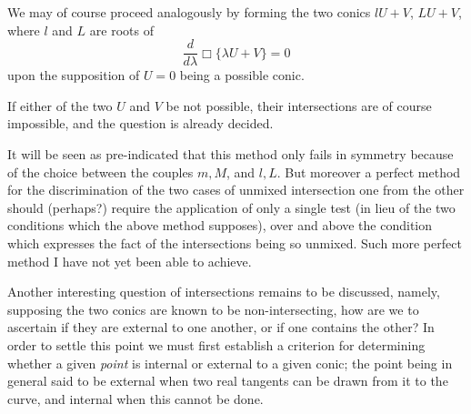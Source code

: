 \documentclass[11pt]{article}
\begin{document}
We may of course proceed analogously by forming the two conics $lU+V$, $LU+V$, where $l$ and $L$ are roots of
\[
\frac{d}{d\lambda}\Box\{\lambda U+V\}=0
\]
upon the supposition of $U=0$ being a possible conic.

If either of the two $U$ and $V$ be not possible, their intersections are of course impossible, and the question is already decided.

It will be seen as pre-indicated that this method only fails in symmetry because of the choice between the couples $m,M$, and $l,L$. But moreover a perfect method for the discrimination of the two cases of unmixed intersection one from the other should (perhaps?) require the application of only a single test (in lieu of the two conditions which the above method supposes), over and above the condition which expresses the fact of the intersections being so unmixed. Such more perfect method I have not yet been able to achieve.

Another interesting question of intersections remains to be discussed, namely, supposing the two conics are known to be non-intersecting, how are we to ascertain if they are external to one another, or if one contains the other? In order to settle this point we must first establish a criterion for determining whether a given \emph{point} is internal or external to a given conic; the point being in general said to be external when two real tangents can be drawn from it to the curve, and internal when this cannot be done.
\end{document}
